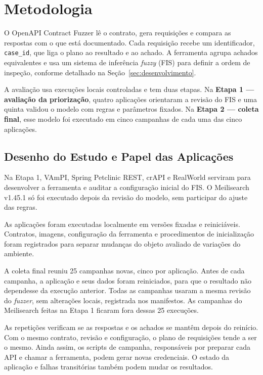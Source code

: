 \section{Metodologia}\label{sec:metodologia}

O OpenAPI Contract Fuzzer lê o contrato, gera requisições e compara as
respostas com o que está documentado. Cada requisição recebe um identificador,
\texttt{case\_id}, que liga o plano ao resultado e ao achado. A ferramenta
agrupa achados equivalentes e usa um sistema de inferência \textit{fuzzy}
(FIS) para definir a ordem de inspeção, conforme detalhado na
Seção~\ref{sec:desenvolvimento}.

A avaliação usa execuções locais controladas e tem duas etapas. Na
\textbf{Etapa 1 --- avaliação da priorização}, quatro aplicações orientaram a
revisão do FIS e uma quinta validou o modelo com regras e parâmetros fixados.
Na \textbf{Etapa 2 --- coleta final}, esse modelo foi executado em cinco
campanhas de cada uma das cinco aplicações.

\subsection{Desenho do Estudo e Papel das Aplicações}

Na Etapa 1, VAmPI, Spring Petclinic REST, crAPI e RealWorld serviram para
desenvolver a ferramenta e auditar a configuração inicial do FIS. O Meilisearch
v1.45.1 só foi executado depois da revisão do modelo, sem participar do ajuste
das regras.

As aplicações foram executadas localmente em versões fixadas e reiniciáveis.
Contratos, imagens, configuração da ferramenta e procedimentos de inicialização
foram registrados para separar mudanças do objeto avaliado de variações do
ambiente.

A coleta final reuniu 25 campanhas novas, cinco por aplicação. Antes de cada
campanha, a aplicação e seus dados foram reiniciados, para que o resultado não
dependesse da execução anterior. Todas as campanhas usaram a mesma revisão do
\textit{fuzzer}, sem alterações locais, registrada nos manifestos. As campanhas
do Meilisearch feitas na Etapa 1 ficaram fora dessas 25 execuções.

As repetições verificam se as respostas e os achados se mantêm depois do
reinício. Com o mesmo contrato, revisão e configuração, o plano de requisições
tende a ser o mesmo. Ainda assim, os scripts de campanha, responsáveis por
preparar cada API e chamar a ferramenta, podem gerar novas credenciais.
O estado da aplicação e falhas transitórias também podem mudar os resultados.

